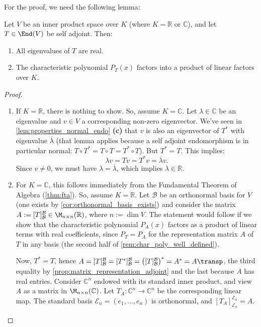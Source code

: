 For the proof, we need the following lemma:

\begin{lemma}
\label{lem:self_adj_properties}
Let $V$ be an inner product space over $K$ (where $K = \mathbb{R}$ or $\mathbb{C}$), and let $T \in \End(V)$ be self adjoint. Then:
\begin{enumerate}[label=\textbf{(\alph*)}]
    \item All eigenvalues of $T$ are real.
    \item The characteristic polynomial $P_T(x)$ factors into a product of linear factors over $K$.
\end{enumerate}
\end{lemma}

\begin{proof}
\begin{enumerate}[label=\textbf{(\alph*)}]
    \item If $K = \mathbb{R}$, there is nothing to show. So, assume $K = \mathbb{C}$. Let $\lambda \in \mathbb{C}$ be an eigenvalue and $v \in V$ a corresponding non-zero eigenvector. We've seen in \cref{lem:properties_normal_endo} \textbf{(c)} that $v$ is also an eigenvector of $T^*$ with eigenvalue $\overline{\lambda}$ (that lemma applies because a self adjoint endomorphism is in particular normal: $T \circ T^* = T \circ T = T^* \circ T$). But $T^* = T$. This implies:
    \[
        \lambda v = Tv = T^*v = \overline{\lambda} v.
    \]
    Since $v \neq 0$, we must have $\lambda = \overline{\lambda}$, which implies $\lambda \in \mathbb{R}$.
    
    \item For $K = \mathbb{C}$, this follows immediately from the Fundamental Theorem of Algebra (\cref{thm:fta}). So, assume $K = \mathbb{R}$. Let $\mathcal{B}$ be an orthonormal basis for $V$ (one exists by \cref{cor:orthonormal_basis_exists}) and consider the matrix $A := [T]_{\mathcal{B}}^{\mathcal{B}} \in \M_{n \times n}(\mathbb{R})$, where $n := \dim V$. The statement would follow if we show that the characteristic polynomial $P_A(x)$ factors as a product of linear terms with real coefficients, since $P_T = P_A$ for the representation matrix $A$ of $T$ in any basis (the second half of \cref{rem:char_poly_well_defined}).
    
    Now, $T^* = T$, hence $A = [T]_{\mathcal{B}}^{\mathcal{B}} = [T^*]_{\mathcal{B}}^{\mathcal{B}} = \left([T]_{\mathcal{B}}^{\mathcal{B}}\right)^* = A^* = A\transp$, the third equality by \cref{prop:matrix_representation_adjoint} and the last because $A$ has real entries.
    Consider $\mathbb{C}^n$ endowed with its standard inner product, and view $A$ as a matrix in $\M_{n \times n}(\mathbb{C})$. Let $T_A \colon \mathbb{C}^n \to \mathbb{C}^n$ be the corresponding linear map. The standard basis $\mathcal{E}_n = (e_1, \dots, e_n)$ is orthonormal, and $[T_A]_{\mathcal{E}_n}^{\mathcal{E}_n} = A$. 
    

\end{enumerate}
\end{proof}

